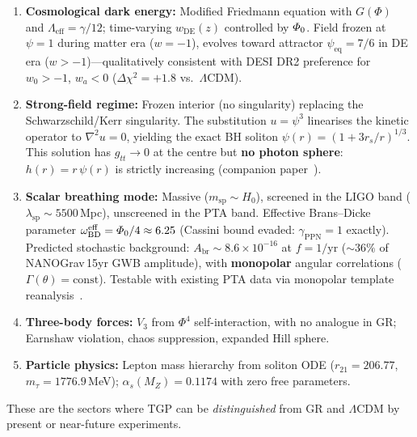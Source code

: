 \begin{enumerate}[nosep]
  \item \textbf{Cosmological dark energy:}
        Modified Friedmann equation with $G(\Phi)$ and
        $\Lambda_{\mathrm{eff}}=\gamma/12$; time-varying
        $w_{\mathrm{DE}}(z)$ controlled by $\varPhi_0$.
        Field frozen at $\psi = 1$ during matter era ($w = -1$),
        evolves toward attractor $\psi_{\mathrm{eq}} = 7/6$ in
        DE era ($w > -1$)---qualitatively consistent with
        DESI DR2 preference for $w_0 > -1$, $w_a < 0$
        ($\Delta\chi^{2}=+1.8$ vs.\ $\Lambda$CDM).

  \item \textbf{Strong-field regime:}
        Frozen interior (no singularity) replacing the
        Schwarzschild/Kerr singularity.  The substitution
        $u = \psi^{3}$ linearises the kinetic operator to
        $\nabla^{2}u = 0$, yielding the exact BH soliton
        $\psi(r) = (1 + 3r_{s}/r)^{1/3}$.  This solution has
        $g_{tt}\to 0$ at the centre but \textbf{no photon sphere}:
        $h(r) = r\,\psi(r)$ is strictly increasing
        (companion paper~\cite{TGP-repo}).

  \item \textbf{Scalar breathing mode:}
        Massive ($m_{\mathrm{sp}}\sim H_{0}$), screened in the
        LIGO band ($\lambda_{\mathrm{sp}} \sim 5500$\,Mpc), unscreened
        in the PTA band.
        Effective Brans--Dicke parameter
        $\omega_{\mathrm{BD}}^{\mathrm{eff}} = \varPhi_0/4 \approx 6.25$
        (Cassini bound evaded: $\gamma_{\mathrm{PPN}}=1$ exactly).
        Predicted stochastic background:
        $A_{\mathrm{br}} \sim 8.6\times 10^{-16}$ at $f = 1/\mathrm{yr}$
        ($\sim 36\%$ of NANOGrav\,15yr GWB amplitude),
        with \textbf{monopolar} angular correlations
        ($\Gamma(\theta) = \mathrm{const}$).
        Testable with existing PTA data via monopolar template
        reanalysis~\cite{NANOGrav-15yr-ST}.

  \item \textbf{Three-body forces:}
        $V_{3}$ from $\Phi^{4}$ self-interaction, with no analogue
        in GR; Earnshaw violation, chaos suppression, expanded
        Hill sphere.

  \item \textbf{Particle physics:}
        Lepton mass hierarchy from soliton ODE
        ($r_{21}=206.77$, $m_{\tau}=1776.9$\,MeV);
        $\alpha_{s}(M_{Z})=0.1174$ with zero free parameters.
\end{enumerate}

\noindent
These are the sectors where TGP can be \emph{distinguished} from
GR and $\Lambda$CDM by present or near-future experiments.
